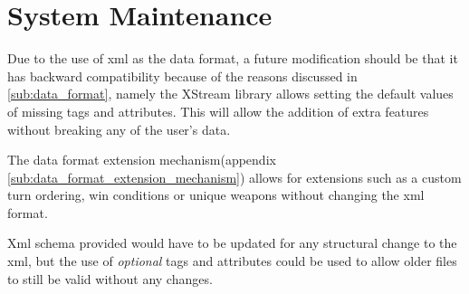 \section{System Maintenance}

Due to the use of xml as the data format, a future modification should be that it has backward compatibility because of the reasons discussed in \ref{sub:data_format}, namely the XStream library allows setting the default values of missing tags and attributes. This will allow the addition of extra features without breaking any of the user's data. 

The data format extension mechanism(appendix \ref{sub:data_format_extension_mechanism}) allows for extensions such as a custom turn ordering, win conditions or unique weapons without changing the xml format.

Xml schema provided would have to be updated for any structural change to the xml, but the use of \emph{optional} tags and attributes could be used to allow older files to still be valid without any changes. 

